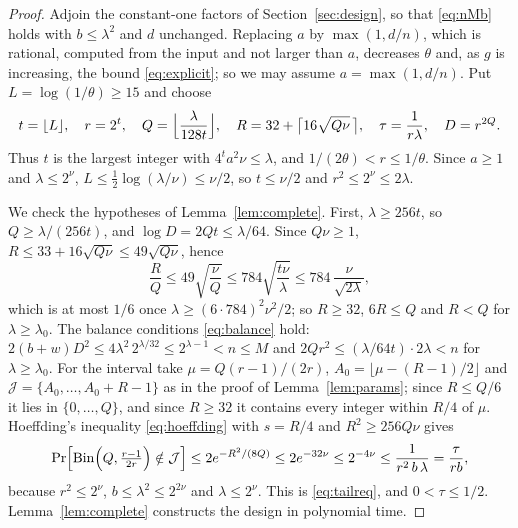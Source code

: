 \documentclass[11pt,reqno]{amsart}
\numberwithin{equation}{section}
\theoremstyle{plain}
\theoremstyle{definition}
\theoremstyle{remark}
\DeclareMathOperator{\Bin}{Bin}
\begin{document}
\begin{proof}
Adjoin the constant-one factors of Section~\ref{sec:design}, so that
\eqref{eq:nMb} holds with $b\le\lambda^2$ and $d$ unchanged. Replacing $a$ by
$\max(1,d/n)$, which is rational, computed from the input and not larger than $a$,
decreases $\theta$ and, as $g$ is increasing, the bound \eqref{eq:explicit}; so we
may assume $a=\max(1,d/n)$. Put
$L=\log(1/\theta)\ge15$ and choose
\[
  t=\lfloor L\rfloor,\quad r=2^{t},\quad Q=\Bigl\lfloor\frac{\lambda}{128t}\Bigr\rfloor,\quad
  R=32+\bigl\lceil16\sqrt{Q\nu}\,\bigr\rceil,\quad \tau=\frac1{r\lambda},\quad D=r^{2Q}.
\]
Thus $t$ is the largest integer with $4^ta^2\nu\le\lambda$, and $1/(2\theta)<r\le1/\theta$.
Since $a\ge1$ and $\lambda\le2^{\nu}$, $L\le\frac12\log(\lambda/\nu)\le\nu/2$, so
$t\le\nu/2$ and $r^2\le2^{\nu}\le2\lambda$.

We check the hypotheses of Lemma~\ref{lem:complete}. First, $\lambda\ge256t$, so
$Q\ge\lambda/(256t)$, and $\log D=2Qt\le\lambda/64$. Since $Q\nu\ge1$,
$R\le33+16\sqrt{Q\nu}\le49\sqrt{Q\nu}$, hence
\begin{equation}\label{eq:RQexplicit}
  \frac RQ\le49\sqrt{\frac\nu Q}\le784\sqrt{\frac{t\nu}{\lambda}}
  \le784\,\frac{\nu}{\sqrt{2\lambda}} ,
\end{equation}
which is at most $1/6$ once $\lambda\ge(6\cdot784)^2\nu^2/2$; so $R\ge32$, $6R\le Q$
and $R<Q$ for $\lambda\ge\lambda_0$. The balance conditions \eqref{eq:balance}
hold: $2(b+w)D^2\le4\lambda^2\,2^{\lambda/32}\le2^{\lambda-1}<n\le M$ and
$2Qr^2\le(\lambda/64t)\cdot2\lambda<n$ for $\lambda\ge\lambda_0$. For the interval
take $\mu=Q(r-1)/(2r)$, $A_0=\lfloor\mu-(R-1)/2\rfloor$ and
$\mathcal J=\{A_0,\dots,A_0+R-1\}$ as in the proof of Lemma~\ref{lem:params}; since
$R\le Q/6$ it lies in $\{0,\dots,Q\}$, and since $R\ge32$ it contains every integer
within $R/4$ of $\mu$. Hoeffding's inequality \eqref{eq:hoeffding} with $s=R/4$
and $R^2\ge256Q\nu$ gives
\[
  \Pr\Bigl[\Bin\Bigl(Q,\tfrac{r-1}{2r}\Bigr)\notin\mathcal J\Bigr]\le2e^{-R^2/(8Q)}
  \le2e^{-32\nu}\le2^{-4\nu}\le\frac1{r^2\,b\,\lambda}=\frac{\tau}{rb},
\]
because $r^2\le2^{\nu}$, $b\le\lambda^2\le2^{2\nu}$ and $\lambda\le2^{\nu}$. This is
\eqref{eq:tailreq}, and $0<\tau\le1/2$. Lemma~\ref{lem:complete} constructs the
design in polynomial time.


\end{proof}
\end{document}
